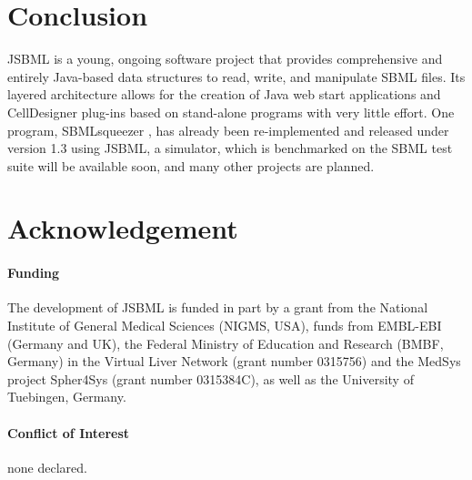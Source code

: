 \documentclass{bioinfo}
\begin{document}


\section{Conclusion}

JSBML is a young, ongoing software project that
provides comprehensive and entirely Java-based data structures
to read, write, and manipulate SBML files. Its layered architecture
allows for the creation of Java web start applications and
CellDesigner plug-ins based on stand-alone programs with very
little effort. One program, SBMLsqueezer \citep{Draeger2008}, has already been
re-implemented and released under version 1.3 using JSBML, a simulator, which is
benchmarked on the SBML test suite will be available soon, and
many other projects are planned.

\section*{Acknowledgement}

\paragraph{Funding\textcolon}

The development of JSBML is funded in part by a grant from the National Institute
of General Medical Sciences (NIGMS, USA), funds from EMBL-EBI (Germany and UK), 
the Federal Ministry of Education and Research (BMBF, Germany) in the Virtual 
Liver Network (grant number 0315756) and the MedSys project Spher4Sys 
(grant number 0315384C), as well as the University of Tuebingen, Germany. 

\paragraph{Conflict of Interest\textcolon} none declared.

%
%
%
%
%
%
%
%
%




\end{document}
